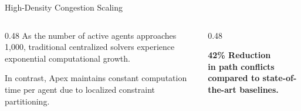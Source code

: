 \begin{frame}{High-Density Congestion Scaling}
    \begin{columns}[T]
        \begin{column}{0.48\textwidth}
            As the number of active agents approaches 1,000, traditional centralized solvers experience exponential computational growth.
            
            \vspace{0.3cm}
            In contrast, Apex maintains constant computation time per agent due to localized constraint partitioning.
        \end{column}
        \begin{column}{0.48\textwidth}
            \vspace{0.5cm}
            \begin{tcolorbox}[colback=ApexLight, colframe=ApexBlue, title=Key Performance Gain, arc=4pt]
                \centering\large\bfseries
                42\% Reduction\\
                \normalfont\small
                in path conflicts compared to state-of-the-art baselines.
            \end{tcolorbox}
        \end{column}
    \end{columns}
\end{frame}
